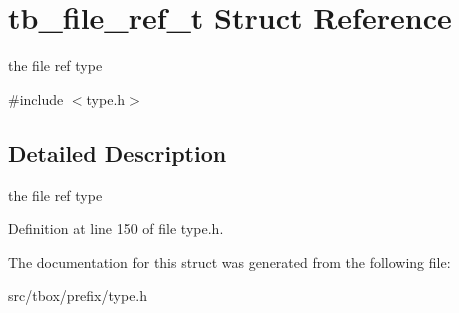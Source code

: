 \hypertarget{structtb__file__ref__t}{\section{tb\-\_\-file\-\_\-ref\-\_\-t Struct Reference}
\label{structtb__file__ref__t}
}


the file ref type  




{\ttfamily \#include $<$type.\-h$>$}



\subsection{Detailed Description}
the file ref type 

Definition at line 150 of file type.\-h.



The documentation for this struct was generated from the following file\-:\begin{DoxyCompactItemize}
\item 
src/tbox/prefix/type.\-h\end{DoxyCompactItemize}
